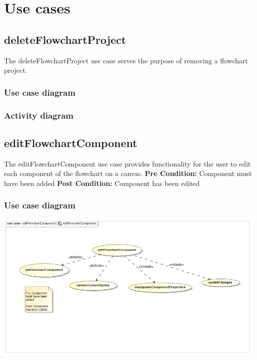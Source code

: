 \documentclass[11pt,a4paper,titlepage]{article}
\begin{document}
\newpage
\section{Use cases}
	
\subsection{deleteFlowchartProject}
The deleteFlowchartProject use case serves the purpose of removing a flowchart project.

\subsubsection{Use case diagram}

\subsubsection{Activity diagram}

\subsection{editFlowchartComponent}
The editFlowchartComponent use case provides functionality for the user to edit each component of the flowchart on a canvas.\newline\newline
\textbf{Pre Condition:} Component must have been added\newline\newline
\textbf{Post Condition:} Component has been edited

\subsubsection{Use case diagram}
\includegraphics[width=500px]{editFlowchartComponentUseCase.jpg}
\end{document}
